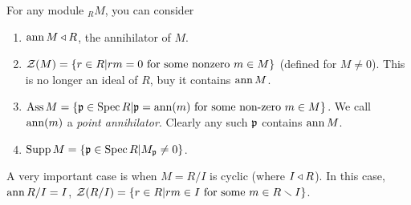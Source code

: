  \setcounter{lecture}{4}


 For any module ${}_R M$, you can consider
 \begin{enumerate}
   \item $\operatorname{ann} M\triangleleft R$, the annihilator of $M$.

   \item $\mathcal{Z}(M) = \{r\in R|rm=0\text{ for some nonzero }m\in M\}$ (defined for $M\neq
       0$). This is no longer an ideal of $R$, buy it contains $\operatorname{ann} M$.

   \item $\operatorname{Ass} M = \{\mathfrak{p}\in \operatorname{Spec} R| \mathfrak{p} = \operatorname{ann}(m)\text{ for some non-zero }m\in M\}$. We
   call $\operatorname{ann} (m)$ a \emph{point annihilator}. Clearly any such $\mathfrak{p}$ contains $\operatorname{ann} M$.

   \item $\operatorname{Supp} M = \{\mathfrak{p}\in \operatorname{Spec} R| M_{\mathfrak{p}}\neq 0\}$.
 \end{enumerate}
 A very important case is when $M=R/I$ is cyclic (where $I\triangleleft R$). In this case, $\operatorname{ann} R/I
 = I$, $\mathcal{Z}(R/I) = \{r\in R|rm\in I\text{ for some }m\in R\smallsetminus I\}$.

